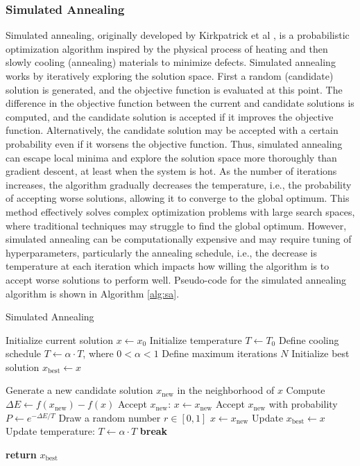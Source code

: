 \documentclass{article}[12pt]
\begin{document}
\subsubsection*{Simulated Annealing}
Simulated annealing, originally developed by Kirkpatrick et al \cite{Kirkpatrick:1983aa}, is a probabilistic optimization algorithm inspired by the physical process of 
heating and then slowly cooling (annealing) materials to minimize defects.
Simulated annealing works by iteratively exploring the solution space. First a random (candidate) solution is generated, and the objective function is evaluated at this point.
The difference in the objective function between the current and candidate solutions is computed, and the candidate solution is accepted if it improves the objective function.
Alternatively, the candidate solution may be accepted with a certain probability even if it worsens the objective function. 
Thus, simulated annealing can escape local minima and explore the solution space more thoroughly than gradient descent, at least when the system is hot.
As the number of iterations increases, the algorithm gradually decreases the temperature, i.e., the probability of accepting worse solutions, allowing it to converge to the global optimum.
This method effectively solves complex optimization problems with large search spaces, where traditional techniques may struggle to find the global optimum.
However, simulated annealing can be computationally expensive and may require tuning of hyperparameters, particularly the annealing schedule, i.e., the decrease is temperature at each iteration which impacts
how willing the algorithm is to accept worse solutions to perform well. Pseudo-code for the simulated annealing algorithm is shown in Algorithm \ref{alg:sa}.

\begin{algorithm}[H]
\caption{Simulated Annealing}\label{alg:sa}
\begin{algorithmic}[1]
\State Initialize current solution $x \gets x_0$
\State Initialize temperature $T \gets T_0$
\State Define cooling schedule $T \gets \alpha \cdot T$, where $0 < \alpha < 1$
\State Define maximum iterations $N$
\State Initialize best solution $x_\text{best} \gets x$

    \State Generate a new candidate solution $x_\text{new}$ in the neighborhood of $x$
    \State Compute $\Delta E \gets f(x_\text{new}) - f(x)$
        \State Accept $x_\text{new}$: $x \gets x_\text{new}$
    \Else
        \State Accept $x_\text{new}$ with probability $P \gets e^{-\Delta E / T}$
        \State Draw a random number $r \in [0, 1]$
            \State $x \gets x_\text{new}$
        \EndIf
    \EndIf
        \State Update $x_\text{best} \gets x$
    \EndIf
    \State Update temperature: $T \gets \alpha \cdot T$
        \State \textbf{break}
    \EndIf
\EndFor

\State \textbf{return} $x_\text{best}$
\end{algorithmic}
\end{algorithm}
\end{document}
